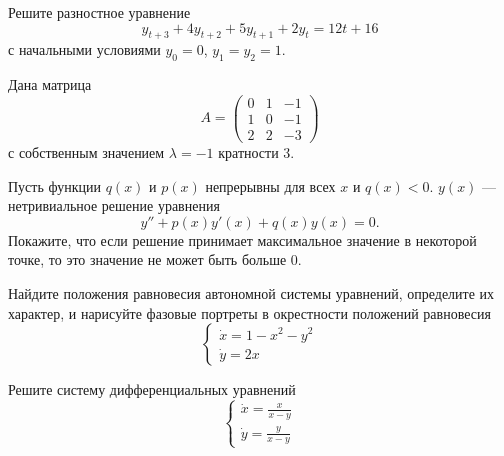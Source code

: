 \documentclass[12pt]{article}
\begin{document}

\begin{examproblems}
\item Решите разностное уравнение
\[
y_{t+3} + 4y_{t+2} + 5y_{t+1} + 2y_t = 12t + 16
\]
с начальными условиями $y_0 = 0$, $y_1 = y_2 = 1$.

\item Дана матрица
\[
A = \begin{pmatrix}
0 & 1 & -1 \\
1 & 0 & -1 \\
2 & 2 & -3
\end{pmatrix}
\]
с собственным значением $\lambda = -1$ кратности 3.

\item Пусть функции $q(x)$ и $p(x)$ непрерывны для всех $x$ и $q(x) < 0$. $y(x)$ — нетривиальное решение уравнения
\[
y'' + p(x)y'(x) + q(x)y(x) = 0.
\]
Покажите, что если решение принимает максимальное значение в некоторой точке, то это значение не может быть больше 0.

\item Найдите положения равновесия автономной системы уравнений, определите их характер, и нарисуйте фазовые портреты в окрестности положений равновесия
\[
\begin{cases}
\dot{x} = 1 - x^2 - y^2 \\
\dot{y} = 2x
\end{cases}
\]

\item Решите систему дифференциальных уравнений
\[
\begin{cases}
\dot{x} = \frac{x}{x - y} \\
\dot{y} = \frac{y}{x - y}
\end{cases}
\]
\end{examproblems}
\end{document}

